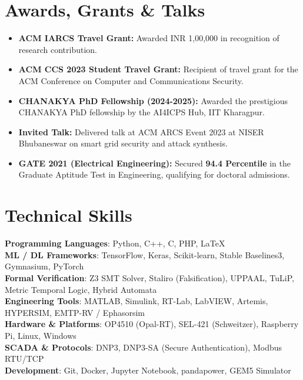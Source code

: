\documentclass[letterpaper,11pt]{article}
\newcommand{\resumeItem}[1]{
  \item\small{
    {#1 \vspace{-2pt}}
  }
}
\newcommand{\resumeSubItem}[1]{\resumeItem{#1}\vspace{-4pt}}
\newcommand{\resumeSubHeadingListStart}{\begin{itemize}[leftmargin=0.15in, label={}]}
\newcommand{\resumeSubHeadingListEnd}{\end{itemize}}
\begin{document}
\section{Awards, Grants \& Talks}
  \resumeSubHeadingListStart
    \resumeSubItem{\textbf{ACM IARCS Travel Grant:} Awarded INR 1,00,000 in recognition of research contribution.}
    \resumeSubItem{\textbf{ACM CCS 2023 Student Travel Grant:} Recipient of travel grant for the ACM Conference on Computer and Communications Security.}
    \resumeSubItem{\textbf{CHANAKYA PhD Fellowship (2024-2025):} Awarded the prestigious CHANAKYA PhD fellowship by the AI4ICPS Hub, IIT Kharagpur.}
    \resumeSubItem{\textbf{Invited Talk:} Delivered talk at ACM ARCS Event 2023 at NISER Bhubaneswar on smart grid security and attack synthesis.}
    \resumeSubItem{\textbf{GATE 2021 (Electrical Engineering):} Secured \textbf{94.4 Percentile} in the Graduate Aptitude Test in Engineering, qualifying for doctoral admissions.}
  \resumeSubHeadingListEnd

\section{Technical Skills}
 \begin{itemize}[leftmargin=0.15in, label={}]
    \small{\item{
     \textbf{Programming Languages}{: Python, C++, C, PHP, LaTeX} \\
     \textbf{ML / DL Frameworks}{: TensorFlow, Keras, Scikit-learn, Stable Baselines3, Gymnasium, PyTorch} \\
     \textbf{Formal Verification}{: Z3 SMT Solver, Staliro (Falsification), UPPAAL, TuLiP, Metric Temporal Logic, Hybrid Automata} \\
     \textbf{Engineering Tools}{: MATLAB, Simulink, RT-Lab, LabVIEW, Artemis, HYPERSIM, EMTP-RV / Ephasorsim} \\
     \textbf{Hardware \& Platforms}{: OP4510 (Opal-RT), SEL-421 (Schweitzer), Raspberry Pi, Linux, Windows} \\
     \textbf{SCADA \& Protocols}{: DNP3, DNP3-SA (Secure Authentication), Modbus RTU/TCP} \\
     \textbf{Development}{: Git, Docker, Jupyter Notebook, pandapower, GEM5 Simulator}
    }}
 \end{itemize}
\end{document}
